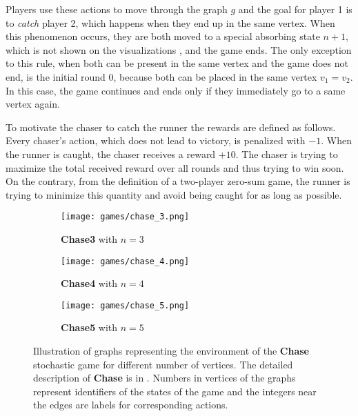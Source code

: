 \documentclass[../main.tex]{subfiles}
\begin{document}
Players use these actions to move through the graph $g$ and the goal for player 1 is to \textit{catch} player 2, which happens when they end up in the same vertex.
When this phenomenon occurs, they are both moved to a special absorbing state $n+1$, which is not shown on the visualizations , and the game ends.
The only exception to this rule, when both can be present in the same vertex and the game does not end, is the initial round $0$, because both can be placed in the same vertex $v_1 = v_2$.
In this case, the game continues and ends only if they immediately go to a same vertex again.

To motivate the chaser to catch the runner the rewards are defined as follows.
Every chaser's action, which does not lead to victory, is penalized with $-1$.
When the runner is caught, the chaser receives a reward $+10$.
The chaser is trying to maximize the total received reward over all rounds and thus trying to win soon.
On the contrary, from the definition of a two-player zero-sum game, the runner is trying to minimize this quantity and avoid being caught for as long as possible.

\begin{figure}[ht]
    \centering
    \begin{subfigure}[b]{0.3\textwidth}
        \centering
        \texttt{[image: games/chase\_3.png]}
        \caption{\textbf{Chase3} with $n = 3$}
        \label{exp:sg:games:chase:examples:3}
    \end{subfigure}
    \hfill
    \begin{subfigure}[b]{0.3\textwidth}
        \centering
        \texttt{[image: games/chase\_4.png]}
        \caption{\textbf{Chase4} with $n = 4$}
        \label{exp:sg:games:chase:examples:4}
    \end{subfigure}
    \hfill
    \begin{subfigure}[b]{0.3\textwidth}
        \centering
        \texttt{[image: games/chase\_5.png]}
        \caption{\textbf{Chase5} with $n = 5$}
        \label{exp:sg:games:chase:examples:5}
    \end{subfigure}
    \caption[Example \textbf{Chase} instances]{Illustration of graphs representing the environment of the \textbf{Chase} stochastic game for different number of vertices. The detailed description of \textbf{Chase} is in . Numbers in vertices of the graphs represent identifiers of the states of the game and the integers near the edges are labels for corresponding actions.}
    \label{exp:sg:games:chase:examples}
\end{figure}
\end{document}
